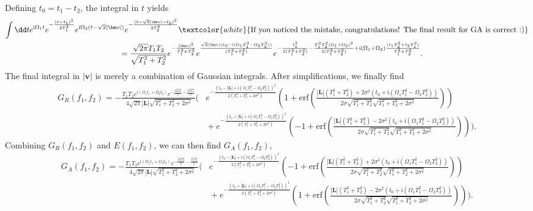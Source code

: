 \documentclass[letterpaper,12pt,titlepage,oneside,final]{book}
\newcommand{\ii}{\mathrm{i}}
\begin{document}
Defining $t_0 = t_1 - t_2$, the integral in $t$ yields{\footnotesize
\begin{align}
     \int \dd t e^{\ii \Omega_1 t} e^{- \frac{(t-t_1)^2}{2T_1^2}}e^{\ii \Omega_2 (t - \sqrt{2}|\bm v|)}& e^{- \frac{(t - \sqrt{2}|\bm v|-t_2)^2}{2T_2^2}}\nonumber \textcolor{white}{\text{If you noticed the mistake, congratulations! The final result for GA is correct :)}}\\
     &\!\!\!\! = \frac{\sqrt{2\pi}T_1 T_2}{\sqrt{T_1^2 + T_2^2}}e^{- \frac{|\bm v|^2}{T_1^2 + T_2^2}}e^{\frac{\sqrt{2}|\bm v|(t_0- \ii (\Omega_1 T_1^2 - \Omega_2 T_2^2))}{(T_1^2 + T_2^2)}}e^{-\frac{t_0^2}{2(T_1^2 + T_2^2)}-\frac{T_1^2T_2^2(\Omega_1+\Omega_2)^2}{2(T_1^2 + T_2^2)}+\ii(\Omega_1 + \Omega_2)\frac{(t_1 T_2^2 + t_2 T_1^2)}{T_1^2 + T_2^2}}.
\end{align}}
The final integral in $|\bm v|$ is merely a combination of Gaussian integrals. After simplifications, we finally find{\footnotesize
\begin{align}
    G_R(f_1,f_2) = - \frac{T_1T_2e^{\ii (\Omega_1 t_1+\Omega_2 t_2)}e^{- \frac{\Omega_2^2 T_2^2}{2} - \frac{\Omega_1^2 T_1^2}{2}}}{4\sqrt{2\pi}|\bm L|\sqrt{T_1^2 + T_2^2 + 2\sigma^2}}\Bigg(&e^{- \frac{(t_0 - |\bm L|+\ii (\Omega_1 T_1^2- \Omega_2 T_2^2))^2}{2(T_1^2 + T_2^2 + 2\sigma^2)}}\left(1 + \text{erf}\left(\tfrac{|\bm L|(T_1^2+T_2^2)+2\sigma^2(t_0+\ii (\Omega_1 T_1^2- \Omega_2 T_2^2))}{2\sigma\sqrt{T_1^2 + T_2^2}\sqrt{T_1^2 + T_2^2 + 2\sigma^2}}\right)\right)\nonumber\\
    &\!\!\!\!\!\!\!\!\!\!\!\!\!\!\!\!\!\!+e^{- \frac{(t_0 + |\bm L|+\ii (\Omega_1 T_1^2- \Omega_2 T_2^2))^2}{2(T_1^2 + T_2^2 + 2\sigma^2)}}\left(-1+\text{erf}\left(\tfrac{|\bm L|(T_1^2+T_2^2)-2\sigma^2(t_0+\ii (\Omega_1 T_1^2- \Omega_2 T_2^2))}{2\sigma\sqrt{T_1^2 + T_2^2}\sqrt{T_1^2 + T_2^2 + 2\sigma^2}}\right)\right)\Bigg).\label{eq:GRbig}
\end{align}}
Combining $G_R(f_1,f_2)$ and $E(f_1,f_2)$, we can then find $G_A(f_1,f_2)$,{\footnotesize
\begin{align}
    G_A(f_1,f_2) = - \frac{T_1T_2e^{\ii (\Omega_1 t_1+\Omega_2 t_2)}e^{- \frac{\Omega_2^2 T_2^2}{2} - \frac{\Omega_1^2 T_1^2}{2}}}{4\sqrt{2\pi}|\bm L|\sqrt{T_1^2 + T_2^2 + 2\sigma^2}}\Bigg(&e^{- \frac{(t_0 - |\bm L|+\ii (\Omega_1 T_1^2- \Omega_2 T_2^2))^2}{2(T_1^2 + T_2^2 + 2\sigma^2)}}\left(-1 + \text{erf}\left(\tfrac{|\bm L|(T_1^2+T_2^2)+2\sigma^2(t_0+\ii (\Omega_1 T_1^2- \Omega_2 T_2^2))}{2\sigma\sqrt{T_1^2 + T_2^2}\sqrt{T_1^2 + T_2^2 + 2\sigma^2}}\right)\right)\nonumber\\
    &\!\!\!\!\!\!\!\!\!\!\!\!\!\!\!\!\!\!+e^{- \frac{(t_0 + |\bm L|+\ii (\Omega_1 T_1^2- \Omega_2 T_2^2))^2}{2(T_1^2 + T_2^2 + 2\sigma^2)}}\left(1+\text{erf}\left(\tfrac{|\bm L|(T_1^2+T_2^2)-2\sigma^2(t_0+\ii (\Omega_1 T_1^2- \Omega_2 T_2^2))}{2\sigma\sqrt{T_1^2 + T_2^2}\sqrt{T_1^2 + T_2^2 + 2\sigma^2}}\right)\right)\Bigg).\label{eq:GAbig}
\end{align}}
\end{document}
